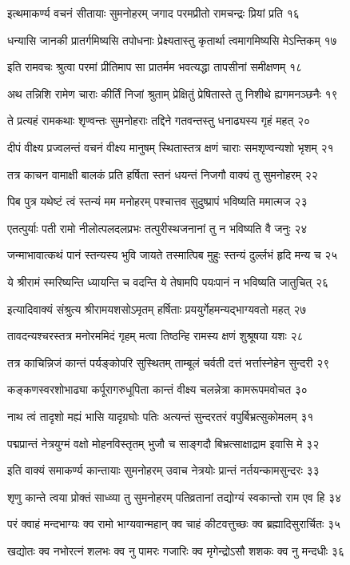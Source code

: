 इत्थमाकर्ण्य वचनं सीतायाः सुमनोहरम्
जगाद परमप्रीतो रामचन्द्रः प्रियां प्रति १६

धन्यासि जानकी प्रातर्गमिष्यसि तपोधनाः
प्रेक्ष्यतास्तु कृतार्था त्वमागमिष्यसि मेऽन्तिकम् १७

इति रामवचः श्रुत्वा परमां प्रीतिमाप सा
प्रातर्मम भवत्यद्धा तापसीनां समीक्षणम् १८

अथ तन्निशि रामेण चाराः कीर्तिं निजां श्रुताम्
प्रेक्षितुं प्रेषितास्ते तु निशीथे ह्यगमनञ्छनैः १९

ते प्रत्यहं रामकथाः शृण्वन्तः सुमनोहराः
तद्दिने गतवन्तस्तु धनाढ्यस्य गृहं महत् २०

दीपं वीक्ष्य प्रज्वलन्तं वचनं वीक्ष्य मानुषम्
स्थितास्तत्र क्षणं चाराः समशृण्वन्यशो भृशम् २१

तत्र काचन वामाक्षी बालकं प्रति हर्षिता
स्तनं धयन्तं निजगौ वाक्यं तु सुमनोहरम् २२

पिब पुत्र यथेष्टं त्वं स्तन्यं मम मनोहरम्
पश्चात्तव सुदुष्प्रापं भविष्यति ममात्मज २३

एतत्पुर्याः पती रामो नीलोत्पलदलप्रभः
तत्पुरीस्थजनानां तु न भविष्यति वै जनुः २४

जन्माभावात्कथं पानं स्तन्यस्य भुवि जायते
तस्मात्पिब मुहुः स्तन्यं दुर्ल्लभं हृदि मन्य च २५

ये श्रीरामं स्मरिष्यन्ति ध्यायन्ति च वदन्ति ये
तेषामपि पयःपानं न भविष्यति जातुचित् २६

इत्यादिवाक्यं संश्रुत्य श्रीरामयशसोऽमृतम्
हर्षिताः प्रययुर्गेहमन्यद्भाग्यवतो महत् २७

तावदन्यश्चरस्तत्र मनोरममिदं गृहम्
मत्वा तिष्ठन्हि रामस्य क्षणं शुश्रूषया यशः २८

तत्र काचिन्निजं कान्तं पर्यङ्कोपरि सुस्थितम्
ताम्बूलं चर्वती दत्तं भर्त्तास्नेहेन सुन्दरी २९

कङ्कणस्वरशोभाढ्या कर्पूरागरुधूपिता
कान्तं वीक्ष्य चलन्नेत्रा कामरूपमवोचत ३०

नाथ त्वं तादृशो मह्यं भासि यादृग्रघोः पतिः
अत्यन्तं सुन्दरतरं वपुर्बिभ्रत्सुकोमलम् ३१

पद्मप्रान्तं नेत्रयुग्मं वक्षो मोहनविस्तृतम्
भुजौ च साङ्गदौ बिभ्रत्साक्षाद्राम इवासि मे ३२

इति वाक्यं समाकर्ण्य कान्तायाः सुमनोहरम्
उवाच नेत्रयोः प्रान्तं नर्तयन्कामसुन्दरः ३३

शृणु कान्ते त्वया प्रोक्तं साध्व्या तु सुमनोहरम्
पतिव्रतानां तद्योग्यं स्वकान्तो राम एव हि ३४

परं क्वाहं मन्दभाग्यः क्व रामो भाग्यवान्महान्
क्व चाहं कीटवत्तुच्छः क्व ब्रह्मादिसुरार्चितः ३५

खद्योतः क्व नभोरत्नं शलभः क्व नु पामरः
गजारिः क्व मृगेन्द्रोऽसौ शशकः क्व नु मन्दधीः ३६

